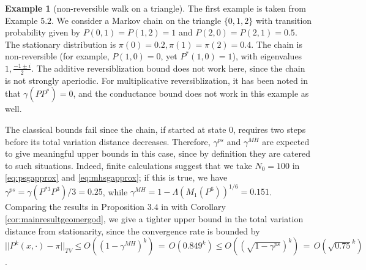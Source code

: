 \documentclass[12pt,a4]{amsart}
\numberwithin{equation}{section}
\theoremstyle{plain}
\theoremstyle{definition}
\newtheorem{example}{Example}[section]
\theoremstyle{remark}
\newcommand{\1}{\mathds{1}}
\renewcommand{\leq}{\leqslant}
\begin{document}
\begin{example}[non-reversible walk on a triangle]\label{ex:1}
	The first example is taken from \cite{MT06} Example $5.2$. We consider a Markov chain on the triangle $\{0,1,2\}$ with transition probability given by $P(0,1) = P(1,2) = 1$ and $P(2,0) = P(2,1) = 0.5$. The stationary distribution is $\pi(0) = 0.2, \pi(1) = \pi(2) = 0.4$. The chain is non-reversible (for example, $P(1,0) = 0$, yet $P^*(1,0) = 1$), with eigenvalues $1, \frac{-1 \pm i}{2}$. The additive reversiblization bound does not work here, since the chain is not strongly aperiodic. For multiplicative reversiblization, it has been noted in \cite{MT06} that $\gamma(PP^*) = 0$, and the conductance bound does not work in this example as well.
	
	The classical bounds fail since the chain, if started at state $0$, requires two steps before its total variation distance decreases. Therefore, $\gamma^{ps}$ and $\gamma^{MH}$ are expected to give meaningful upper bounds in this case, since by definition they are catered to such situations. Indeed, finite calculations suggest that we take $N_0 = 100$ in \eqref{eq:psgapprox} and \eqref{eq:mhsgapprox}; if this is true, we have $\gamma^{ps} = \gamma(P^{*3}P^3)/3 = 0.25$, while $\gamma^{MH} = 1-\Lambda(M_1(P^6))^{1/6} = 0.151$. Comparing the results in Proposition $3.4$ in \cite{Paulin15} with Corollary \ref{cor:mainresultgeomergod}, we give a tighter upper bound in the total variation distance from stationarity, since the convergence rate is bounded by $||P^k(x,\cdot) - \pi||_{TV} \leq O((1-\gamma^{MH})^k) {\, = \,} O(0.849^k) \leq O((\sqrt{1-\gamma^{ps}})^k)  {\, = \,} O(\sqrt{0.75}^k)$.
	

\end{example}
\end{document}
